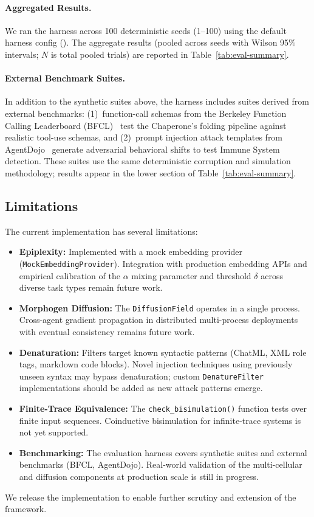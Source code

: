 \paragraph{Aggregated Results.}
We ran the harness across 100 deterministic seeds (1--100) using the default harness config
(). The
aggregate results (pooled across seeds with Wilson 95\% intervals; $N$ is total pooled trials) are reported
in Table~\ref{tab:eval-summary}.

\paragraph{External Benchmark Suites.}
In addition to the synthetic suites above, the harness includes
suites derived from external benchmarks: (1)~function-call schemas from
the Berkeley Function Calling Leaderboard (BFCL)~\cite{patil2023gorilla}
test the Chaperone's folding pipeline against realistic tool-use schemas,
and (2)~prompt injection attack templates from
AgentDojo~\cite{debenedetti2024agentdojo} generate adversarial behavioral
shifts to test Immune System detection. These suites use the same
deterministic corruption and simulation methodology; results appear in the
lower section of Table~\ref{tab:eval-summary}.



\subsection{Limitations}

The current implementation has several limitations:

\begin{itemize}[leftmargin=*]
\item \textbf{Epiplexity:} Implemented with a mock embedding provider (\texttt{MockEmbeddingProvider}).
Integration with production embedding APIs and empirical calibration of the $\alpha$ mixing parameter
and threshold $\delta$ across diverse task types remain future work.
\item \textbf{Morphogen Diffusion:} The \texttt{DiffusionField} operates in a single process. Cross-agent
gradient propagation in distributed multi-process deployments with eventual consistency remains future work.
\item \textbf{Denaturation:} Filters target known syntactic patterns (ChatML, XML role tags, markdown
code blocks). Novel injection techniques using previously unseen syntax may bypass denaturation; custom
\texttt{DenatureFilter} implementations should be added as new attack patterns emerge.
\item \textbf{Finite-Trace Equivalence:} The \texttt{check\_bisimulation()} function tests over finite input sequences.
Coinductive bisimulation for infinite-trace systems is not yet supported.
\item \textbf{Benchmarking:} The evaluation harness covers synthetic suites and external benchmarks (BFCL,
AgentDojo). Real-world validation of the multi-cellular and diffusion components at production scale is
still in progress.
\end{itemize}

We release the implementation to enable further scrutiny and extension of the framework.
